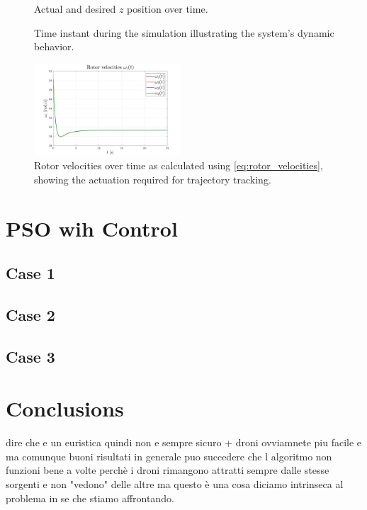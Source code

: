 \begin{figure}[h!]
\begin{minipage}[b]{0.49\textwidth}
        \caption[Tracking in Z-axis]{Actual and desired $z$ position over time.}
        \label{fig:pid_z}
    \end{minipage}
\end{figure}

\begin{figure}[h!]
    \centering
    \caption[Simulation Overview]{Time instant during the simulation illustrating the system's dynamic behavior.}
    \label{fig:pid_sim}
\end{figure}

\begin{figure}[h!]
    \centering
    \includegraphics[width=0.49\textwidth]{images/rotor_velocities.png}
    \caption[Rotor Velocities]{Rotor velocities over time as calculated using \eqref{eq:rotor_velocities}, showing the actuation required for trajectory tracking.}
    \label{fig:rotor_velocities}
\end{figure}

\section{PSO wih Control}
\subsection{Case 1}
\subsection{Case 2}
\subsection{Case 3}

\section{Conclusions}
dire che e un euristica quindi non e sempre sicuro
+ droni ovviamnete piu facile e 
ma comunque buoni risultati in generale 
puo succedere che l algoritmo non funzioni bene a volte 
perchè i droni rimangono
attratti sempre dalle stesse sorgenti e non 
"vedono" delle altre ma questo è una cosa diciamo 
intrinseca al problema in se che stiamo affrontando.



